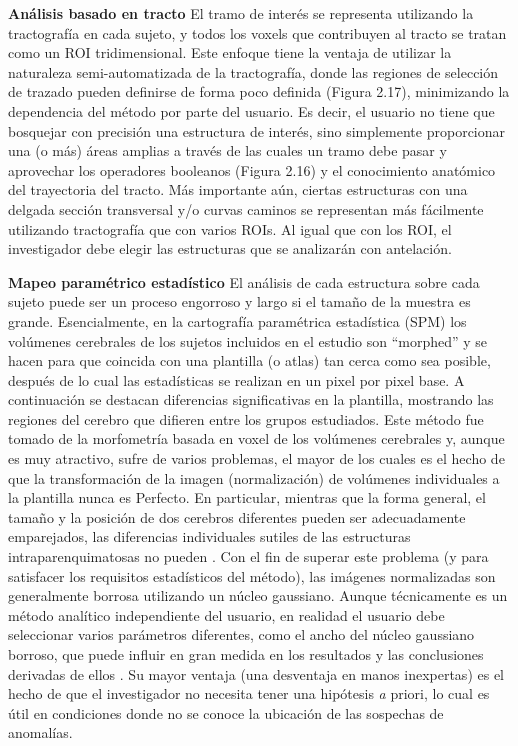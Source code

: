 \textbf{Análisis basado en tracto} El tramo de interés se representa utilizando la tractografía en cada sujeto, y todos los voxels que contribuyen al tracto se tratan como un ROI tridimensional. Este enfoque tiene la ventaja de utilizar la naturaleza semi-automatizada de la tractografía, donde las regiones de selección de trazado pueden definirse de forma poco definida (Figura 2.17), minimizando la dependencia del método por parte del usuario. Es decir, el usuario no tiene que bosquejar con precisión una estructura de interés, sino simplemente proporcionar una (o más) áreas amplias a través de las cuales un tramo debe pasar y aprovechar los operadores booleanos (Figura 2.16) y el conocimiento anatómico del trayectoria del tracto. Más importante aún, ciertas estructuras con una delgada sección transversal y/o curvas caminos se representan más fácilmente utilizando tractografía que con varios ROIs. Al igual que con los ROI, el investigador debe elegir las estructuras que se analizarán con antelación.

\textbf{Mapeo paramétrico estadístico} El análisis de cada estructura sobre cada sujeto puede ser un proceso engorroso y largo si el tamaño de la muestra es grande. Esencialmente, en la cartografía paramétrica estadística (SPM) los volúmenes cerebrales de los sujetos incluidos en el estudio son ``morphed'' y se hacen para que coincida con una plantilla (o atlas) tan cerca como sea posible, después de lo cual las estadísticas se realizan en un pixel por pixel base. A continuación se destacan diferencias significativas en la plantilla, mostrando las regiones del cerebro que difieren entre los grupos estudiados. Este método fue tomado de la morfometría basada en voxel de los volúmenes cerebrales \cite{Wright_1995,Ashburner_2001} y, aunque es muy atractivo, sufre de varios problemas, el mayor de los cuales es el hecho de que la transformación de la imagen (normalización) de volúmenes individuales a la plantilla nunca es Perfecto. En particular, mientras que la forma general, el tamaño y la posición de dos cerebros diferentes pueden ser adecuadamente emparejados, las diferencias individuales sutiles de las estructuras intraparenquimatosas no pueden \cite{Ashburner_2001}. Con el fin de superar este problema (y para satisfacer los requisitos estadísticos del método), las imágenes normalizadas son generalmente borrosa utilizando un núcleo gaussiano. Aunque técnicamente es un método analítico independiente del usuario, en realidad el usuario debe seleccionar varios parámetros diferentes, como el ancho del núcleo gaussiano borroso, que puede influir en gran medida en los resultados y las conclusiones derivadas de ellos \cite{Jones_2005,Jones_2007}. Su mayor ventaja (una desventaja en manos inexpertas) es el hecho de que el investigador no necesita tener una hipótesis {\emph a priori}, lo cual es útil en condiciones donde no se conoce la ubicación de las sospechas de anomalías.

